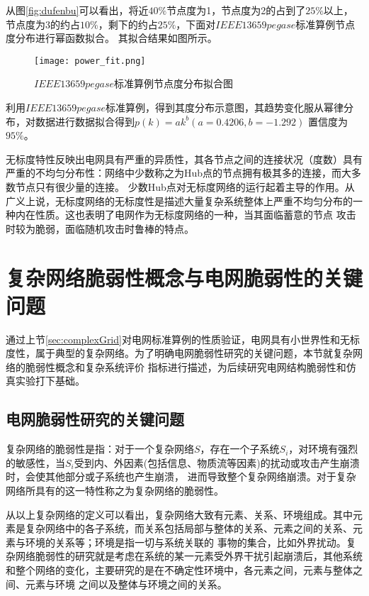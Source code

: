 从图\ref{fig:dufenbu}可以看出，将近$40\%$节点度为1，节点度为2的占到了$25\%$以上，节点度为3的约占$10\%$，剩下的约占$25\%$，下面对$IEEE13659pegase$标准算例节点度分布进行幂函数拟合。
其拟合结果如图所示。
\begin{figure}[H] %
  \centering
  \texttt{[image: power\_fit.png]}
  \caption{$IEEE13659pegase$标准算例节点度分布拟合图}
  \label{fig:fower_fit}
\end{figure}

利用$IEEE13659pegase$标准算例，得到其度分布示意图，其趋势变化服从幂律分布，对数据进行数据拟合得到$p(k)=a k^{b}(a=0.4206, b=-1.292)$ 置信度为$95\%$。

无标度特性反映出电网具有严重的异质性，其各节点之间的连接状况（度数）具有严重的不均匀分布性：网络中少数称之为Hub点的节点拥有极其多的连接，而大多数节点只有很少量的连接。
少数Hub点对无标度网络的运行起着主导的作用。从广义上说，无标度网络的无标度性是描述大量复杂系统整体上严重不均匀分布的一种内在性质。这也表明了电网作为无标度网络的一种，当其面临蓄意的节点
攻击时较为脆弱，面临随机攻击时鲁棒的特点。

\section{复杂网络脆弱性概念与电网脆弱性的关键问题}
\label{sec:load}
通过上节\ref{sec:complexGrid}对电网标准算例的性质验证，电网具有小世界性和无标度性，属于典型的复杂网络。为了明确电网脆弱性研究的关键问题，本节就复杂网络的脆弱性概念和复杂系统评价
指标进行描述，为后续研究电网结构脆弱性和仿真实验打下基础。

\subsection{电网脆弱性研究的关键问题}
\label{sec:loadEffect}
复杂网络的脆弱性是指：对于一个复杂网络$S$，存在一个子系统$S_i$，对环境有强烈的敏感性，当$S_i$受到内、外因素(包括信息、物质流等因素)的扰动或攻击产生崩溃时，会使其他部分或子系统也产生崩溃，
进而导致整个复杂网络崩溃。对于复杂网络所具有的这一特性称之为复杂网络的脆弱性。

从以上复杂网络的定义可以看出，复杂网络大致有元素、关系、环境组成。其中元素是复杂网络中的各子系统，而关系包括局部与整体的关系、元素之间的关系、元素与环境的关系等；环境是指一切与系统关联的
事物的集合，比如外界扰动。复杂网络脆弱性的研究就是考虑在系统的某一元素受外界干扰引起崩溃后，其他系统和整个网络的变化，主要研究的是在不确定性环境中，各元素之间，元素与整体之间、元素与环境
之间以及整体与环境之间的关系\cite{refs31}。

